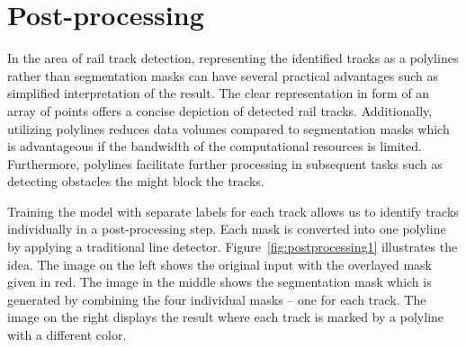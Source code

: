 \documentclass[Master,MDS,english]{BASE/twbook} %
\begin{document}
\section{Post-processing}

In the area of rail track detection, representing the identified tracks as a polylines rather than segmentation masks can have several practical advantages such as simplified interpretation of the result. The clear representation in form of an array of points offers a concise depiction of detected rail tracks. Additionally, utilizing polylines reduces data volumes compared to segmentation masks which is advantageous if the bandwidth of the computational resources is limited. Furthermore, polylines facilitate further processing in subsequent tasks such as detecting obstacles the might block the tracks. 

Training the model with separate labels for each track allows us to identify tracks individually in a post-processing step. Each mask is converted into one polyline by applying a traditional line detector.  
Figure~\ref{fig:postprocessing1} illustrates the idea. The image on the left shows the original input with the overlayed mask given in red. The image in the middle shows the segmentation mask which is generated by combining the four individual masks -- one for each track. The image on the right displays the result where each track is marked by a polyline with a different color.
\end{document}
